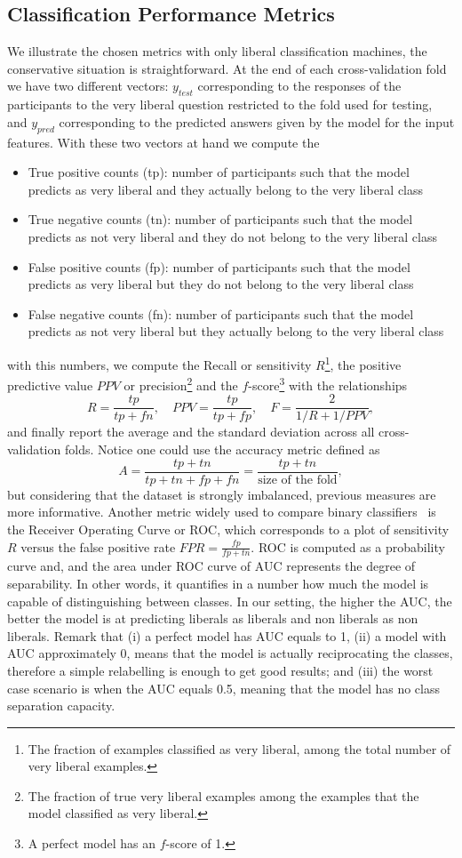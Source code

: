\documentclass[onesided]{article}\usepackage[]{graphicx}\usepackage[]{color}
\begin{document}
\subsection{Classification Performance Metrics} We illustrate the chosen metrics with only liberal classification machines, the conservative situation is straightforward. At the end of each cross-validation fold we have two different vectors: $y_{test}$ corresponding to the responses of the participants to the very liberal question restricted to the fold used for testing, and $y_{pred}$ corresponding to the predicted answers given by the model for the input features. With these two vectors at hand we compute the 
\begin{itemize}
\item True positive counts (tp): number of participants such that the model predicts as very liberal and they actually belong to the very liberal class
\item True negative counts (tn): number of participants such that the model predicts as not very liberal and they do not belong to the very liberal class
\item False positive counts (fp): number of participants such that the model predicts as very liberal but they do not belong to the very liberal class
\item False negative counts (fn): number of participants such that the model predicts as not very liberal but they actually belong to the very liberal class
\end{itemize}
with this numbers, we compute the Recall or sensitivity $R$\footnote{The fraction of examples classified as very liberal, among the total number of very liberal examples.}, the positive predictive value $PPV$ or precision\footnote{The fraction of true very liberal examples among the examples that the model classified as very liberal.} and the $f$-score\footnote{A perfect model has an $f$-score of 1.} with the relationships
$$
R=\frac{tp}{tp+fn},\quad PPV=\frac{tp}{tp+fp},\quad F=\frac{2}{1/R+1/PPV},
$$
and finally report the average and the standard deviation across all cross-validation folds. Notice one could use the accuracy metric defined as
$$
A = \frac{tp+tn}{tp+tn+fp+fn}=\frac{tp+tn}{\text{size of the fold}},
$$
but considering that the dataset is strongly imbalanced, previous measures are more informative. Another metric widely used to compare binary classifiers~\cite{wolff2019machine,artetxe2020balanced} is the Receiver Operating Curve or ROC, which corresponds to a plot of sensitivity $R$ versus the false positive rate
$
FPR = \frac{fp}{fp+tn}.
$
ROC is computed as a probability curve and, and the area under ROC curve of AUC represents the degree of separability. In other words, it quantifies in a number how much the model is capable of distinguishing between classes. In our setting, the higher the AUC, the better the model is at predicting liberals as liberals and non liberals as non liberals. Remark that (i) a perfect model has AUC equals to 1, (ii) a model with AUC approximately 0, means that the model is actually reciprocating the classes, therefore a simple relabelling is enough to get good results; and (iii) the worst case scenario is when the AUC equals 0.5, meaning that the model has no class separation capacity.
\end{document}
